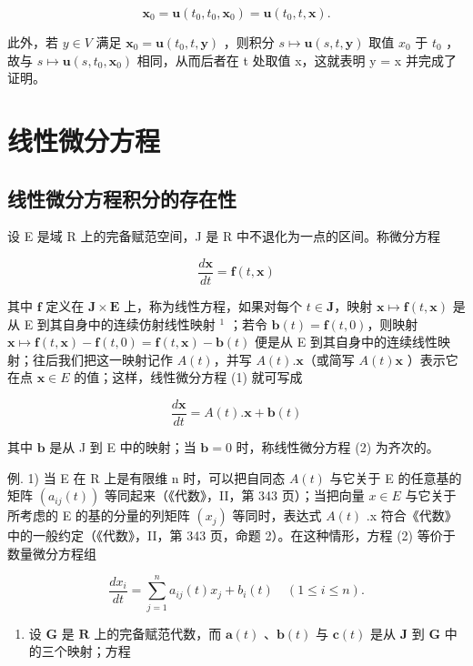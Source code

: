 \[
\mathbf {x} _ {0} = \mathbf {u} (t _ {0}, t _ {0}, \mathbf {x} _ {0}) = \mathbf {u} (t _ {0}, t, \mathbf {x}).
\]

此外，若 \(y \in V\) 满足 \(\mathbf{x}_{0} = \mathbf{u}(t_{0}, t, \mathbf{y})\) ，则积分 \(s \mapsto \mathbf{u}(s, t, \mathbf{y})\) 取值 \(x_{0}\) 于 \(t_{0}\) ，故与 \(s \mapsto \mathbf{u}(s, t_{0}, \mathbf{x}_{0})\) 相同，从而后者在 t 处取值 x，这就表明 y = x 并完成了证明。

\section{线性微分方程}

\subsection{线性微分方程积分的存在性}

设 E 是域 R 上的完备赋范空间，J 是 R 中不退化为一点的区间。称微分方程

\[
{\frac {d \mathbf {x}}{d t}} = \mathbf {f} (t, \mathbf {x})\tag{1}
\]

其中 \(\mathbf{f}\) 定义在 \(\mathbf{J} \times \mathbf{E}\) 上，称为线性方程，如果对每个 \(t \in \mathbf{J}\)，映射 \(\mathbf{x} \mapsto \mathbf{f}(t, \mathbf{x})\) 是从 E 到其自身中的连续仿射线性映射 \(^1\) ；若令 \(\mathbf{b}(t) = \mathbf{f}(t, 0)\)，则映射 \(\mathbf{x} \mapsto \mathbf{f}(t, \mathbf{x}) - \mathbf{f}(t, 0) = \mathbf{f}(t, \mathbf{x}) - \mathbf{b}(t)\) 便是从 E 到其自身中的连续线性映射；往后我们把这一映射记作 \(A(t)\)，并写 \(A(t).\mathbf{x}\)（或简写 \(A(t)\mathbf{x}\) ）表示它在点 \(\mathbf{x} \in E\) 的值；这样，线性微分方程 (1) 就可写成

\[
{\frac {d \mathbf {x}}{d t}} = A (t). \mathbf {x} + \mathbf {b} (t)\tag{2}
\]

其中 \(\mathbf{b}\) 是从 J 到 E 中的映射；当 \(\mathbf{b} = 0\) 时，称线性微分方程 (2) 为齐次的。

例. 1) 当 E 在 R 上是有限维 n 时，可以把自同态 \(A(t)\) 与它关于 E 的任意基的矩阵 \(\left(a_{ij}(t)\right)\) 等同起来（《代数》，II，第 343 页）；当把向量 \(x \in E\) 与它关于所考虑的 E 的基的分量的列矩阵 \(\left(x_{j}\right)\) 等同时，表达式 \(A(t)\) .x 符合《代数》中的一般约定（《代数》，II，第 343 页，命题 2）。在这种情形，方程 (2) 等价于数量微分方程组

\[
\frac {d x _ {i}}{d t} = \sum_ {j = 1} ^ {n} a _ {i j} (t) x _ {j} + b _ {i} (t) \quad (1 \leqslant i \leqslant n).\tag{3}
\]

\begin{enumerate}
\def\labelenumi{\arabic{enumi})}
\setcounter{enumi}{1}
\tightlist
\item
  设 \(\mathbf{G}\) 是 \(\mathbf{R}\) 上的完备赋范代数，而 \(\mathbf{a}(t)\) 、\(\mathbf{b}(t)\) 与 \(\mathbf{c}(t)\) 是从 \(\mathbf{J}\) 到 \(\mathbf{G}\) 中的三个映射；方程
\end{enumerate}

